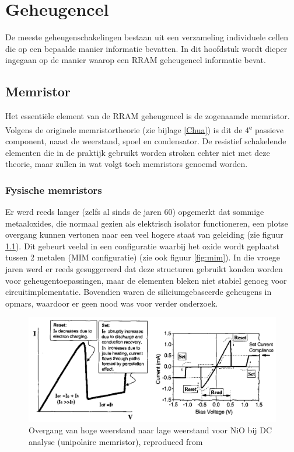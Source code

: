 \chapter{Geheugencel}
\label{cell}
De meeste geheugenschakelingen bestaan uit een verzameling individuele cellen die op een bepaalde manier informatie bevatten.
In dit hoofdstuk wordt dieper ingegaan op de manier waarop een RRAM geheugencel informatie bevat.

\section{Memristor}
Het essentiële element van de RRAM geheugencel is de zogenaamde memristor.
Volgens de originele memristortheorie (zie bijlage \ref{Chua}) is dit de 4\textsuperscript{e} passieve component, naast de weerstand, spoel en condensator. De resistief schakelende elementen die in de praktijk gebruikt worden stroken echter niet met deze theorie, maar zullen in wat volgt toch memristors genoemd worden.

\subsection{Fysische memristors}
Er werd reeds langer (zelfs al sinds de jaren 60) opgemerkt dat sommige metaaloxides, die normaal gezien als elektrisch isolator functioneren, een plotse overgang kunnen vertonen naar een veel hogere staat van geleiding (zie figuur \ref{fig:i-v}). Dit gebeurt veelal in een configuratie waarbij het oxide wordt geplaatst tussen 2 metalen (MIM configuratie)\cite{Won12} (zie ook figuur \ref{fig:mim}). In die vroege jaren werd er reeds gesuggereerd dat deze structuren gebruikt konden worden voor geheugentoepassingen\cite{Sim67}, maar de elementen bleken niet stabiel genoeg voor circuitimplementatie. Bovendien waren de siliciumgebaseerde geheugens in opmars, waardoor er geen nood was voor verder onderzoek.

\begin{figure}[ht!]
  \centering
  \includegraphics[scale=0.20]{../fig/hfdstk-cel-I-V.png}
  \caption[Resistieve schakeling]{Overgang van hoge weerstand naar lage weerstand voor NiO bij DC analyse (unipolaire memristor), reproduced from\cite{Bae04}}
  \label{fig:i-v}
\end{figure}

